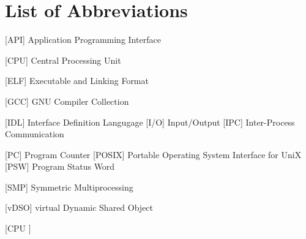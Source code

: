 
\chapter*{List of Abbreviations}

\begin{acronym} [CPU ]
 [API] {Application Programming Interface}


 [CPU] {Central Processing Unit}


 [ELF] {Executable and Linking Format}


 [GCC] {GNU Compiler Collection}


 [IDL] {Interface Definition Langugage}
 [I/O] {Input/Output}
[IPC] {Inter-Process Communication}







     [PC] {Program Counter}
 [POSIX] {Portable Operating System Interface for UniX}
 [PSW] {Program Status Word}



 [SMP] {Symmetric Multiprocessing}



 [vDSO] {virtual Dynamic Shared Object}





\end{acronym} [CPU ]

